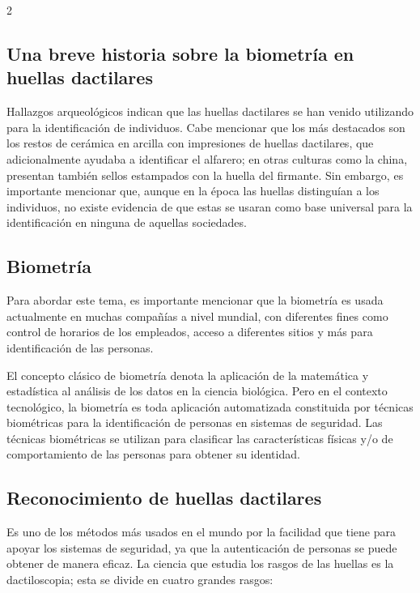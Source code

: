 \documentclass[12pt,spanish,Letterpaper,openany]{book}
\begin{document}
\begin {multicols}{2}
\hypertarget{una-breve-historia-sobre-la-biometruxeda-en-huellas-dactilares}{%
\subsection{Una breve historia sobre la biometría en huellas dactilares}\label{una-breve-historia-sobre-la-biometruxeda-en-huellas-dactilares}}

Hallazgos arqueológicos indican que las huellas dactilares se han venido utilizando para la identificación de individuos. Cabe mencionar que los más destacados son los restos de cerámica en arcilla con impresiones de huellas dactilares, que adicionalmente ayudaba a identificar el alfarero; en otras culturas como la china, presentan también sellos estampados con la huella del firmante. Sin embargo, es importante mencionar que, aunque en la época las huellas distinguían a los individuos, no existe evidencia de que estas se usaran como base universal para la identificación en ninguna de aquellas sociedades.

\hypertarget{biometruxeda}{%
\subsection{Biometría}\label{biometruxeda}}

Para abordar este tema, es importante mencionar que la biometría es usada actualmente en muchas compañías a nivel mundial, con diferentes fines como control de horarios de los empleados, acceso a diferentes sitios y más para identificación de las personas.

El concepto clásico de biometría denota la aplicación de la matemática y estadística al análisis de los datos en la ciencia biológica. Pero en el contexto tecnológico, la biometría es toda aplicación automatizada constituida por técnicas biométricas para la identificación de personas en sistemas de seguridad. Las técnicas biométricas se utilizan para clasificar las características físicas y/o de comportamiento de las personas para obtener su identidad.

\hypertarget{reconocimiento-de-huellas-dactilares}{%
\subsection{Reconocimiento de huellas dactilares}\label{reconocimiento-de-huellas-dactilares}}

Es uno de los métodos más usados en el mundo por la facilidad que tiene para apoyar los sistemas de seguridad, ya que la autenticación de personas se puede obtener de manera eficaz. La ciencia que estudia los rasgos de las huellas es la
dactiloscopia; esta se divide en cuatro grandes rasgos:


\end{multicols}
\end{document}
